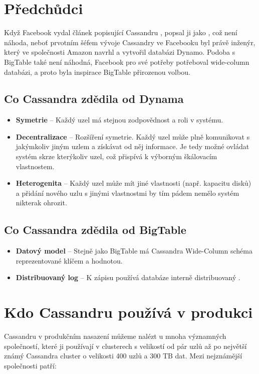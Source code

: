 \section{Předchůdci}

Když Facebook vydal článek popisující Cassandru \cite{facebookcassandra}, popsal ji jako , což není náhoda, neboť prvotním šéfem vývoje Cassandry ve Facebooku byl právě inženýr, který ve společnosti Amazon navrhl a vytvořil databázi Dynamo. Podoba s BigTable také není náhodná, Facebook pro své potřeby potřeboval wide-column databázi, a proto byla inspirace BigTable přirozenou volbou. 

\subsection{Co Cassandra zdědila od Dynama}
\begin{itemize}
\item \textbf{Symetrie} – Každý uzel má stejnou zodpovědnost a roli v systému.
\item \textbf{Decentralizace} – Rozšíření symetrie. Každý uzel může plně komunikovat s jakýmkoliv jiným uzlem a získávat od něj informace. Je tedy možné ovládat systém skrze kterýkoliv uzel, což přispívá k výborným škálovacím vlastnostem. 
\item \textbf{Heterogenita} – Každý uzel může mít jiné vlastnosti (např. kapacitu disků) a přidání nového uzlu s jinými vlastnostmi by tím pádem nemělo systém nikterak ohrozit. 
\end{itemize} 

\subsection{Co Cassandra zdědila od BigTable}
\begin{itemize}
\item \textbf{Datový model} – Stejně jako BigTable má Cassandra Wide-Column schéma reprezentované klíčem a hodnotou.
\item \textbf{Distribuovaný log} – K zápisu používá databáze interně distribuovaný . 
\end{itemize} 

\section{Kdo Cassandru používá v produkci}

Cassandru v produkčním nasazení můžeme nalézt u mnoha významných společností, které ji používají v clusterech s velikostí od pár uzlů až po největší známý Cassandra cluster o velikosti 400 uzlů a 300 TB dat. Mezi nejznámější společnosti patří:

